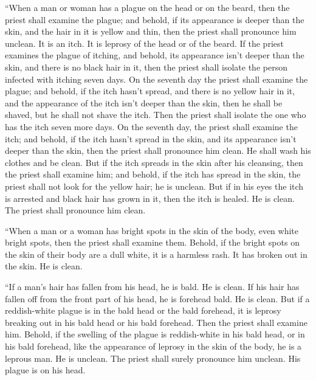  ``When a man or woman has a plague on the head or on the
beard,  then the priest shall examine the plague; and
behold, if its appearance is deeper than the skin, and the hair in it is
yellow and thin, then the priest shall pronounce him unclean. It is an
itch. It is leprosy of the head or of the beard.  If the
priest examines the plague of itching, and behold, its appearance isn't
deeper than the skin, and there is no black hair in it, then the priest
shall isolate the person infected with itching seven days.
 On the seventh day the priest shall examine the plague;
and behold, if the itch hasn't spread, and there is no yellow hair in
it, and the appearance of the itch isn't deeper than the skin,
 then he shall be shaved, but he shall not shave the
itch. Then the priest shall isolate the one who has the itch seven more
days.  On the seventh day, the priest shall examine the
itch; and behold, if the itch hasn't spread in the skin, and its
appearance isn't deeper than the skin, then the priest shall pronounce
him clean. He shall wash his clothes and be clean.  But
if the itch spreads in the skin after his cleansing, 
then the priest shall examine him; and behold, if the itch has spread in
the skin, the priest shall not look for the yellow hair; he is unclean.
 But if in his eyes the itch is arrested and black hair
has grown in it, then the itch is healed. He is clean. The priest shall
pronounce him clean.

 ``When a man or a woman has bright spots in the skin of
the body, even white bright spots,  then the priest shall
examine them. Behold, if the bright spots on the skin of their body are
a dull white, it is a harmless rash. It has broken out in the skin. He
is clean.

 ``If a man's hair has fallen from his head, he is bald.
He is clean.  If his hair has fallen off from the front
part of his head, he is forehead bald. He is clean.  But
if a reddish-white plague is in the bald head or the bald forehead, it
is leprosy breaking out in his bald head or his bald forehead.
 Then the priest shall examine him. Behold, if the
swelling of the plague is reddish-white in his bald head, or in his bald
forehead, like the appearance of leprosy in the skin of the body,
 he is a leprous man. He is unclean. The priest shall
surely pronounce him unclean. His plague is on his head.

